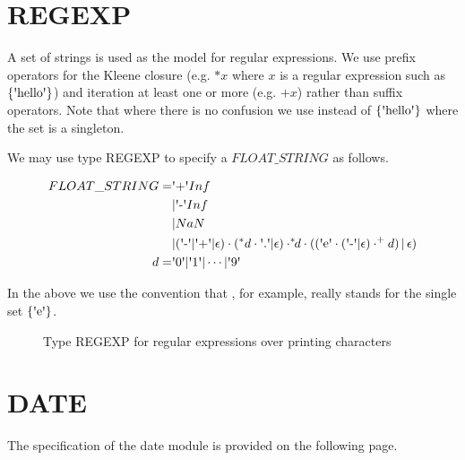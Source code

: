 \documentclass[runningheads,12pt]{article}
\begin{document}
\newpage
\appendix

\section{REGEXP}


A set of strings is used as the model for regular expressions. We use prefix operators for the Kleene closure (e.g. $*x$ where $x$ is a regular expression such as $\{\squote{hello}\}$) and iteration at least one or more (e.g. $\textrm{+}x$) rather than suffix operators. Note that where there is no confusion we use  instead of $\{\squote{hello}\}$ where the set is a singleton. 

We may use type REGEXP to specify a $FLOAT\_STRING$ as follows.

\begin{align}
FLOAT\_STRING = &\squote{+}Inf\\
&|\squote{-}Inf\\
&|NaN\\
&|(\squote{-}|\squote{+}|\epsilon)\cdot(^*d\cdot\squote{.}|\epsilon)\cdot
	^*\!\!d\cdot ((\squote{e}\cdot(\squote{-}|\epsilon)\cdot^\textrm{+}d)\,|\,\epsilon)\\
d = &\squote{0} | \squote{1} | \cdots |\squote{9} 
\end{align}

In the above we use the convention that , for example, really stands for the single set $\{\squote{e}\}$.


\begin{figure} [H]

\caption{Type REGEXP for regular expressions over printing characters}
\end{figure}




\section{DATE}
The specification of the date module is provided on the following page.
\newpage
\end{document}
